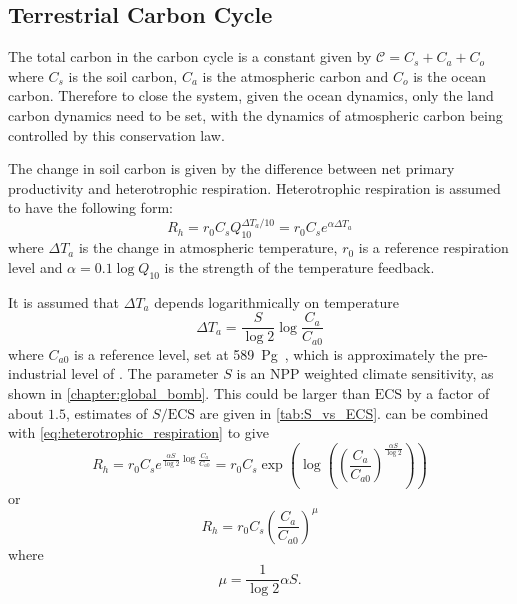 \subsection{Terrestrial Carbon Cycle}
The total carbon in the carbon cycle is a constant given by $\mathcal{C}  = C_s + C_a + C_o$ where $C_s$ is the soil carbon, $C_a$ is the atmospheric carbon  and $C_o$ is the ocean carbon.
Therefore to close the system, given the ocean dynamics, only the land carbon dynamics need to be set, with the dynamics of atmospheric carbon being controlled by this conservation law.

The change in soil carbon is given by the difference between net primary productivity and heterotrophic respiration. Heterotrophic
respiration is assumed to have the following form:
\begin{equation}
  \label{eq:heterotrophic_respiration}
  R_h = r_0 C_s Q_{10}^{\Delta T_a/10} = r_0 C_s e^{\alpha \Delta T_a}
\end{equation}
where $\Delta T_a$ is the change in atmospheric temperature, $r_0$ is a reference respiration level and $\alpha = 0.1\log Q_{10}$ is the strength of the temperature feedback.

It is assumed that $\Delta T_a$ depends logarithmically on temperature
\begin{equation}
  \label{eq:air_temperature}
  \Delta T_a = \frac{S}{\log 2} \log \frac{C_a}{C_{a0}}
\end{equation}
where $C_{a0}$ is a reference  level, set at \SI{589}{\peta\gram\carbon}, which is approximately the pre-industrial
level of  \parencite{Lade2018}. The parameter $S$ is an NPP weighted climate sensitivity, as shown in
\cref{chapter:global_bomb}. This could be larger than $\mathrm{ECS}$ by a factor of about $1.5$, estimates of $S/\mathrm{ECS}$ are given
in \cref{tab:S_vs_ECS}.  can be combined with \cref{eq:heterotrophic_respiration} to give
\begin{equation}
  R_h = r_0 C_s e^{\frac{\alpha S}{\log 2} \log \frac{C_a}{C_{a0}}} = r_0 C_s \exp\left(\log \left( \left(\frac{C_a}{C_{a0}}\right)^{\frac{\alpha S}{\log 2}}\right)\right)
\end{equation}
or
\begin{equation}
  \label{eq:heterotrophic_respiration_combined}
  R_h = r_0 C_s \left( \frac{C_a}{C_{a0}}\right)^{\mu}
\end{equation}
where
\begin{equation}
  \label{eq:mu}
  \mu = \frac{1}{\log 2} \alpha S.
\end{equation}

